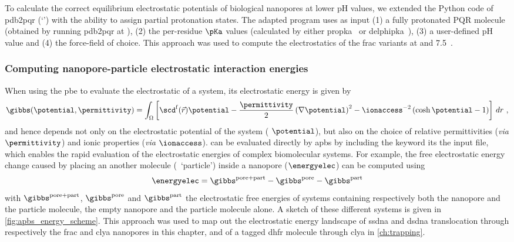 To calculate the correct equilibrium electrostatic potentials of biological nanopores at lower pH values, we
extended the Python code of \gls{pdb2pqr} (`') with the ability to assign partial
protonation states. The adapted program uses as input (1) a fully protonated PQR molecule (obtained by running
\gls{pdb2pqr} at ), (2) the per-residue $\pKa$ values (calculated by either
\gls{propka}~\cite{Olsson-2011} or \gls{delphipka}~\cite{Wang-2015}), (3) a user-defined pH value and (4) the
force-field of choice. This approach was used to compute the electrostatics of the \gls{frac} variants at
 and \num{7.5}~\cite{Huang-2017}.
%



\subsubsection{Computing nanopore-particle electrostatic interaction energies}
%
\label{sec:elec:methods:elec:energy}
%


When using the \gls{pbe} to evaluate the electrostatic of a system, its electrostatic energy is given
by~\cite{Baker-2005}
%
\begin{equation}\label{eq:pbe_energy}
  \gibbs (\potential, \permittivity) = \int_\Omega \left[
    \scd^{\rm{f}}(\vec{r}) \potential
    - \dfrac{\permittivity}{2}\left( \nabla \potential \right)^2
    - \ionaccess^{-2} \left( \cosh \potential - 1 \right)
  \right] \,dr
  \text{ ,}
\end{equation}
%
and hence depends not only on the electrostatic potential of the system ( $\potential$), but also on
the choice of relative permittivities (\textit{via} $\permittivity$) and ionic properties (\textit{via}
$\ionaccess$).  can be evaluated directly by \gls{apbs} by including the 
keyword its the input file, which enables the rapid evaluation of the electrostatic energies of complex
biomolecular systems. For example, the free electrostatic energy change caused by placing an another molecule
(\ie~`particle') inside a nanopore ($\energyelec$) can be computed using~\cite{Homeyer-2015}
%
\begin{equation}\label{eq:electrostatic_energy}
  \energyelec = \gibbs^{\rm{pore+part}} - \gibbs^{\rm{pore}} - \gibbs^{\rm{part}}
\end{equation}
%
with $\gibbs^{\rm{pore+part}}$, $\gibbs^{\rm{pore}}$ and $\gibbs^{\rm{part}}$ the electrostatic free energies
of systems containing respectively both the nanopore and the particle molecule, the empty nanopore and the
particle molecule alone. A sketch of these different systems is given in \cref{fig:apbs_energy_scheme}. This
approach was used to map out the electrostatic energy landscape of \gls{ssdna} and \gls{dsdna} translocation
through respectively the \gls{frac} and \gls{clya} nanopores in this chapter, and of a tagged \gls{dhfr}
molecule through \gls{clya} in \cref{ch:trapping}.

